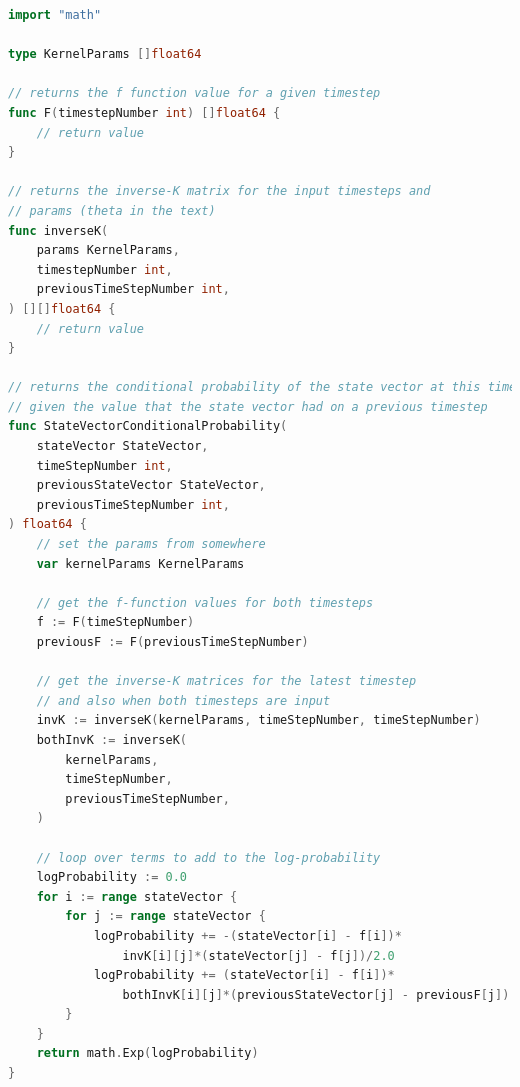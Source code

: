 \begin{lstlisting}[language=Go]
import "math"

type KernelParams []float64

// returns the f function value for a given timestep
func F(timestepNumber int) []float64 {
    // return value
}

// returns the inverse-K matrix for the input timesteps and 
// params (theta in the text)
func inverseK(
    params KernelParams,
    timestepNumber int, 
    previousTimeStepNumber int,
) [][]float64 {
    // return value
}

// returns the conditional probability of the state vector at this timestep 
// given the value that the state vector had on a previous timestep
func StateVectorConditionalProbability(
    stateVector StateVector,
    timeStepNumber int,
    previousStateVector StateVector,
    previousTimeStepNumber int,
) float64 {
    // set the params from somewhere
    var kernelParams KernelParams
    
    // get the f-function values for both timesteps
    f := F(timeStepNumber)
    previousF := F(previousTimeStepNumber)
    
    // get the inverse-K matrices for the latest timestep
    // and also when both timesteps are input
    invK := inverseK(kernelParams, timeStepNumber, timeStepNumber)
    bothInvK := inverseK(
        kernelParams, 
        timeStepNumber, 
        previousTimeStepNumber,
    )

    // loop over terms to add to the log-probability
    logProbability := 0.0
    for i := range stateVector {
        for j := range stateVector {
            logProbability += -(stateVector[i] - f[i])*
                invK[i][j]*(stateVector[j] - f[j])/2.0
            logProbability += (stateVector[i] - f[i])*
                bothInvK[i][j]*(previousStateVector[j] - previousF[j])
        }
    }
    return math.Exp(logProbability)
}
\end{lstlisting}

